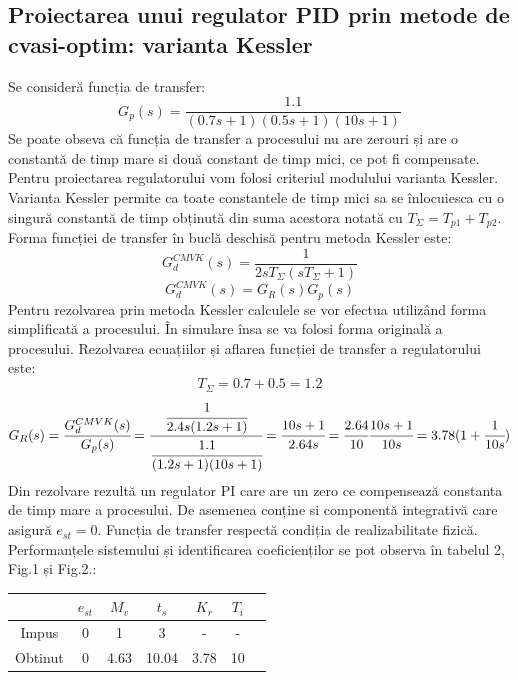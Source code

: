 \documentclass{article}
\begin{document}
\subsection{Proiectarea unui regulator PID prin metode de cvasi-optim: varianta Kessler}
Se consideră funcția de transfer:
\begin{equation} 
G_p(s)=\frac{1.1}{(0.7s+1)(0.5s+1)(10s+1)}
\end{equation}
Se poate obseva că funcția de transfer a procesului nu are zerouri și are o  constantă de timp mare si două constant de timp mici, ce pot fi compensate. Pentru proiectarea regulatorului vom folosi criteriul modulului varianta Kessler. Varianta Kessler permite ca toate constantele de timp mici sa se înlocuiesca cu o singură constantă de timp obținută din suma acestora notată cu $T_{\Sigma}=T_{p1}+T_{p2}$.
Forma funcției de transfer în buclă deschisă pentru metoda Kessler este:
\begin{equation} 
G_d^{CMVK}(s)=\frac{1}{2sT_{\Sigma}(sT_{\Sigma}+1)}
\end{equation}
\begin{equation} 
G_d^{CMVK}(s)=G_R(s)G_p(s)
\end{equation}
Pentru rezolvarea prin metoda Kessler calculele se vor efectua utilizând forma simplificată a procesului. În simulare însa se va folosi forma originală a procesului. Rezolvarea ecuațiilor și aflarea funcției de transfer a regulatorului este:
$$T_{\Sigma}=0.7+0.5=1.2$$
$$G_R(s)=\cfrac{G_d^{CMVK}(s)}{G_p(s)}=\cfrac{\cfrac{1}{2.4s(1.2s+1)}}{\cfrac{1.1}{(1.2s+1)(10s+1)}}=\cfrac{10s+1}{2.64s}=\cfrac{2.64}{10}\cfrac{10s+1}{10s}=3.78(1+\cfrac{1}{10s})$$
Din rezolvare rezultă un regulator PI care are un zero ce compensează constanta de timp mare a procesului. De asemenea conține si componentă integrativă care asigură $e_{st}=0$. Funcția de transfer respectă condiția de realizabilitate fizică. Performanțele sistemului și identificarea coeficienților se pot observa în tabelul 2, Fig.1 și Fig.2.:
\begin{center}
	\begin{tabular}{|c|c|c|c|c|c|c|}
		\hline
		&$e_{st}$&$M_v$&$t_s$&$K_r$&$T_i$\\
		\hline
		Impus&0&1&3&-&-\\
		\hline
		Obtinut&0&4.63&10.04&3.78&10\\
		\hline
	\end{tabular}
\end{center}
\end{document}
